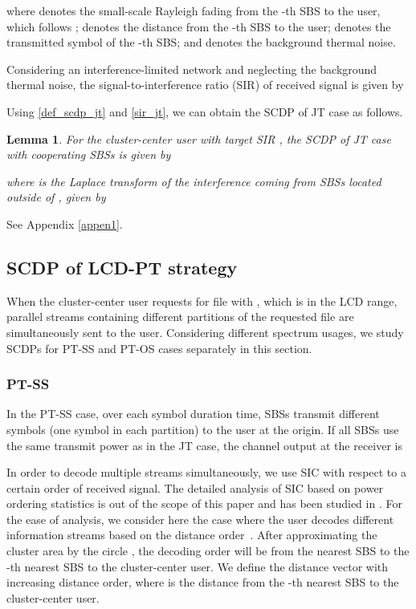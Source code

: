 \documentclass[twocolumns,10pt]{IEEEtran}
\newtheorem{lemma}{Lemma}
\begin{document}
where  denotes the small-scale Rayleigh fading from the -th SBS to the user, which follows ;  denotes the distance from the -th SBS to the user;  denotes the transmitted symbol of the -th SBS; and  denotes the background thermal noise.

Considering an interference-limited network and neglecting the background thermal noise, the signal-to-interference ratio (SIR) of received signal is given by
 
Using  \eqref{def_scdp_jt} and \eqref{sir_jt}, we can obtain the SCDP of JT case as follows.

\begin{lemma}
	\label{lemma1}
	For the cluster-center user with target SIR ,
	the SCDP of JT case with  cooperating SBSs is given by
	 
	where  is the Laplace transform of the interference coming from SBSs located outside of , given by
	
\end{lemma}
\begin{IEEEproof}
	\textnormal{See Appendix \ref{appen1}.}
\end{IEEEproof}


\subsection{SCDP of LCD-PT strategy} 
When the cluster-center user requests for file  with , which is in the LCD range, parallel streams containing different partitions of the requested file are simultaneously sent to the user. Considering different spectrum usages, we study SCDPs for PT-SS and PT-OS cases separately in this section.
\subsubsection{PT-SS}
\label{PT}
In the PT-SS case, over each symbol duration time,  SBSs transmit  different symbols (one symbol in each partition)  to the user at the origin. If all SBSs use the same transmit power  as in the JT case, the channel output at the receiver is
 
In order to decode multiple streams simultaneously, we use SIC with respect to a certain order of received signal.
The detailed analysis of SIC based on power ordering statistics is out of the scope of this paper and has been studied in \cite{zhang2014}. For the ease of analysis, we consider here the case where the user decodes different information streams based on the distance order~\cite{successive_ic}. After approximating the cluster area by the circle , the decoding order will be from the nearest SBS to the -th nearest SBS to the cluster-center user.
We define  the distance vector with increasing distance order, where  is the distance from the -th nearest SBS to the cluster-center user. 
\end{document}
